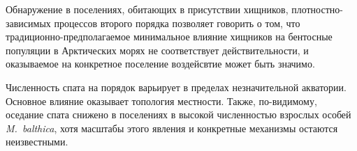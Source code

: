 Обнаружение в поселениях, обитающих в присутствии хищников, плотностно-зависимых процессов второго порядка позволяет говорить о том, что традиционно-предполагаемое минимальное влияние хищников на бентосные популяции в Арктических морях не соответствует действительности, и оказываемое на конкретное поселение воздейсвтие может быть значимо.

Численность спата на порядок варьирует в пределах незначительной акватории.
Основное влияние оказывает топология местности.
Также, по-видимому, оседание спата снижено в поселениях в высокой численностью взрослых особей {\it M.~balthica}, хотя масштабы этого явления и конкретные механизмы остаются неизвестными.


